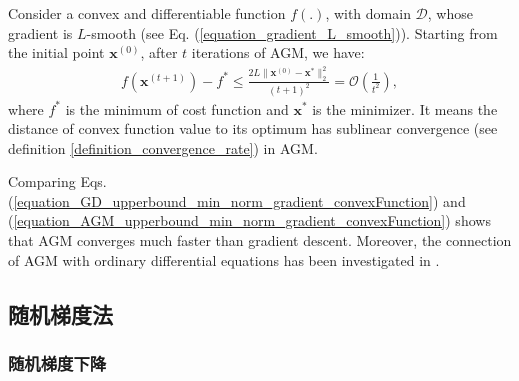 \documentclass[lang=cn,10pt]{gorgeousnbook}
\numberwithin{equation}{section}%
\numberwithin{figure}{section}%
\begin{document}
\begin{theorem}\label{theorem_AGM_convergence_rate_convexFunction}
Consider a convex and differentiable function $f(.)$, with domain $\mathcal{D}$, whose gradient is $L$-smooth (see Eq. (\ref{equation_gradient_L_smooth})).
Starting from the initial point $\boldsymbol{x}^{(0)}$, after $t$ iterations of AGM, we have:
\begin{align}\label{equation_AGM_upperbound_min_norm_gradient_convexFunction}
f(\boldsymbol{x}^{(t+1)}) - f^* \leq \frac{2 L \|\boldsymbol{x}^{(0)} - \boldsymbol{x}^*\|_2^2}{(t+1)^2} = \mathcal{O}(\frac{1}{t^2}),
\end{align}
where $f^*$ is the minimum of cost function and $\boldsymbol{x}^*$ is the minimizer. 
It means the distance of convex function value to its optimum has sublinear convergence (see definition \ref{definition_convergence_rate}) in AGM.
\end{theorem}
Comparing Eqs. (\ref{equation_GD_upperbound_min_norm_gradient_convexFunction}) and (\ref{equation_AGM_upperbound_min_norm_gradient_convexFunction}) shows that AGM converges much faster than gradient descent. 
Moreover, the connection of AGM with ordinary differential equations has been investigated in \cite{su2016differential}.

\subsection{随机梯度法}


\subsubsection{随机梯度下降}

\end{document}
